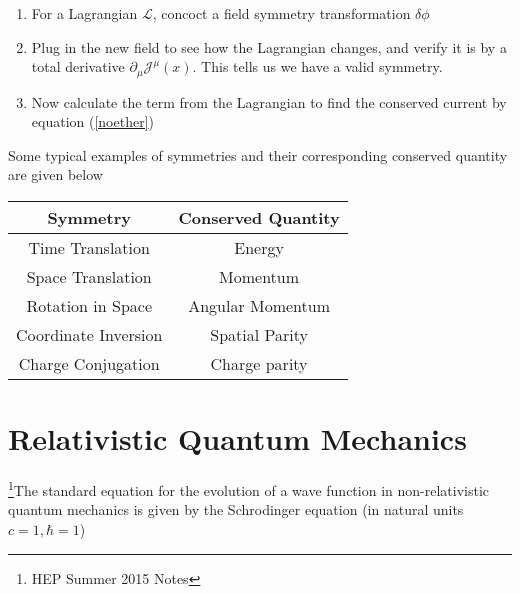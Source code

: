 \begin{enumerate}
    \item For a Lagrangian $\mathcal{L}$, concoct a field symmetry transformation $\delta\phi$
    \item Plug in the new field to see how the Lagrangian changes, and verify it is by a total derivative $\partial_\mu\mathcal{J}^\mu(x)$. This tells us we have a valid symmetry.
    \item Now calculate the term from the Lagrangian to find the conserved current by equation (\ref{noether})
\end{enumerate}

Some typical examples of symmetries and their corresponding conserved quantity are given below

\begin{center}
\begin{tabular}{ | c | c|} 
\hline
 Symmetry & Conserved Quantity\\ \hline
 Time Translation & Energy  \\ 
 Space Translation & Momentum  \\
Rotation in Space & Angular Momentum \\ 
Coordinate Inversion & Spatial Parity\\
Charge Conjugation & Charge parity \\
\hline
\end{tabular}
\end{center}


\section{Relativistic Quantum Mechanics}
\footnote{HEP Summer 2015 Notes}The standard equation for the evolution of a wave function in non-relativistic quantum mechanics is given by the Schrodinger equation (in natural units $c=1,\hbar=1$)

